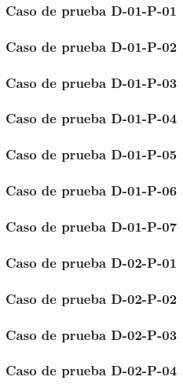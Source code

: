 \documentclass[10pt,a4paper]{article}
\begin{document}
			\subsubsection{Caso de prueba D-01-P-01}

			\subsubsection{Caso de prueba D-01-P-02}

			\subsubsection{Caso de prueba D-01-P-03}

			\subsubsection{Caso de prueba D-01-P-04}

			\subsubsection{Caso de prueba D-01-P-05}

			\subsubsection{Caso de prueba D-01-P-06}

			\subsubsection{Caso de prueba D-01-P-07}

			\subsubsection{Caso de prueba D-02-P-01}

			\subsubsection{Caso de prueba D-02-P-02}

			\subsubsection{Caso de prueba D-02-P-03}

			\subsubsection{Caso de prueba D-02-P-04}
\end{document}
